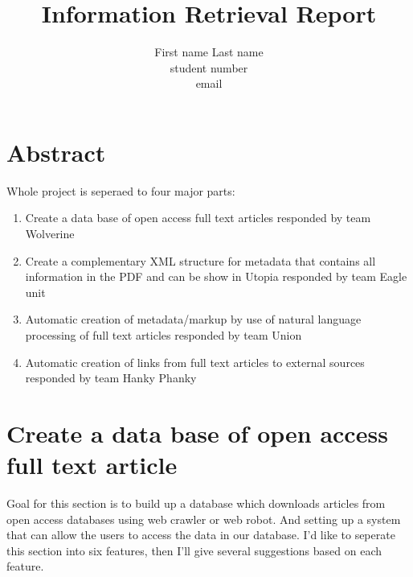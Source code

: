 \documentclass[a4paper]{article} %
\begin{document}
	
	\title{Information Retrieval Report}
	\author{First name Last name \\ student number \\ email} 
	
	\maketitle                     %
	
	
	
	
	
	\section*{Abstract}
	\label{abstract}
	
	Whole project is seperaed to four major parts:
	\begin{enumerate}
		\item Create a data base of open access full text articles responded by team Wolverine
		\item Create a complementary XML structure for metadata that contains all information in the PDF and can be show in Utopia responded by team Eagle unit
		\item Automatic creation of metadata/markup by use of natural language processing of full text articles responded by team Union
		\item Automatic creation of links from full text articles to external sources responded by team Hanky Phanky
	\end{enumerate}
	
	
	\section*{Create a data base of open access full text article}
	\label{task1}
	
	Goal for this section is to build up a database which downloads articles from open access databases using web crawler or web robot. And setting up a system that can allow the users to access the data in our database. I'd like to seperate this section into six features, then I'll give several suggestions based on each feature. 
	
\end{document}
